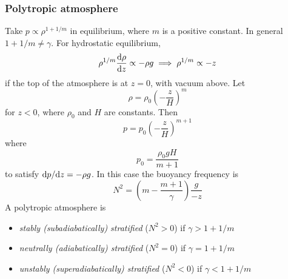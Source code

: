\documentclass{jknotes}
\begin{document}
\subsubsection{Polytropic atmosphere}
Take $p \propto \rho^{1+1/m}$ in equilibrium, where $m$ is a positive
constant. In general $1+1/m \ne \gamma$. For hydrostatic equilibrium,
\begin{equation}
	\rho^{1/m} \frac{\diffd \rho}{\diffd z} \propto -\rho g \implies
	\rho^{1/m} \propto -z
\end{equation}
if the top of the atmosphere is at $z=0$, with vacuum above. Let
\begin{equation}
	\rho = \rho_0 \left( -\frac{z}{H}\right)^m
\end{equation}
for $z < 0$, where $\rho_0$ and $H$ are constants. Then
\begin{equation}
	p = p_0 \left(-\frac{z}{H}\right)^{m+1}
\end{equation}
where
\begin{equation}
	p_0 = \frac{\rho_0 g H}{m+1}
\end{equation}
to satisfy $\diffd p/\diffd z = -\rho g$. In this case the buoyancy frequency
is
\begin{equation}
	N^2 = \left(m - \frac{m+1}{\gamma} \right) \frac{g}{-z}
\end{equation}
A polytropic atmosphere is
\begin{itemize}
	\item \emph{stably (subadiabatically) stratified} ($N^2 > 0$) if $\gamma >
		1+1/m$
	\item \emph{neutrally (adiabatically) stratified} ($N^2 = 0$) if $\gamma =
		1+1/m$
	\item \emph{unstably (superadiabatically) stratified} ($N^2 < 0$) if
		$\gamma < 1+1/m$
\end{itemize}
\end{document}
